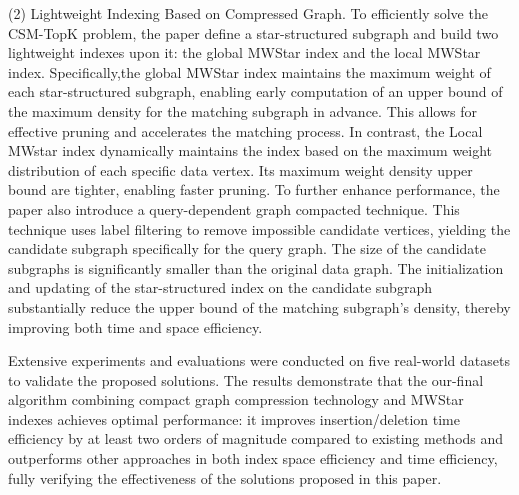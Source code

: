 \begin{enabstract}
	(2) Lightweight Indexing Based on Compressed Graph. To efficiently solve the CSM-TopK problem, the paper define a star-structured subgraph and build two lightweight indexes upon it: the global MWStar index and the local MWStar index. Specifically,the global MWStar index maintains the maximum weight of each star-structured subgraph, enabling early computation of an upper bound of the maximum density for the matching subgraph in advance. This allows for effective pruning and accelerates the matching process.
	In contrast, the Local MWstar index dynamically maintains the index based on the maximum weight distribution of each specific data vertex. Its maximum weight density upper bound are tighter, enabling faster pruning. To further enhance performance, the paper also introduce a query-dependent graph compacted technique. 
	This technique uses label filtering to remove impossible candidate vertices, yielding the candidate subgraph specifically for the query graph. 
	The size of the candidate subgraphs is significantly smaller than the original data graph. 
	The initialization and updating of the star-structured index on the candidate subgraph substantially reduce the upper bound of the matching subgraph's density, thereby improving both time and space efficiency.

	Extensive experiments and evaluations were conducted on five real-world datasets to validate the proposed solutions. The results demonstrate that the our-final algorithm combining compact graph compression technology and MWStar indexes achieves optimal performance: it improves insertion/deletion time efficiency by at least two orders of magnitude compared to existing methods and outperforms other approaches in both index space efficiency and time efficiency, fully verifying the effectiveness of the solutions proposed in this paper.
\end{enabstract}